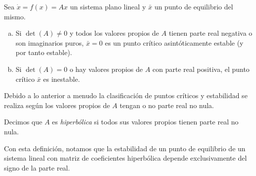 \begin{theorem} \label{teo:criterioestabilidadlineales}
Sea $\dot{x} = f(x) = Ax$ un sistema plano lineal y $\bar{x}$ un punto de equilibrio del mismo.

\begin{enumerate}[(a)]
	\item Si $\det(A) \neq 0$ y todos los valores propios de $A$ tienen parte real negativa o son imaginarios puros, $\bar{x} = 0$ es un punto crítico asintóticamente estable (y por tanto estable).
	\item Si $\det(A) = 0$ o hay valores propios de $A$ con parte real positiva, el punto crítico $\bar{x}$ es inestable.
\end{enumerate}

Debido a lo anterior a menudo la clasificación de puntos críticos y estabilidad se realiza según los valores propios de $A$ tengan o no parte real no nula.

\begin{definition} Decimos que $A$ es \emph{hiperbólica} si todos sus valores propios tienen parte real no nula.
\end{definition}

Con esta definición, notamos que la estabilidad de un punto de equilibrio de un sistema lineal con matriz de coeficientes hiperbólica depende exclusivamente del signo de la parte real.

\end{theorem}

